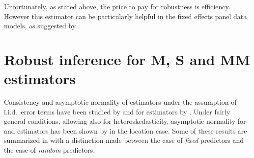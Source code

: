 Unfortunately, as stated above, the price to pay for robustness is efficiency.
However this  estimator can be particularly helpful in the fixed
effects panel data models, as suggested by \citet{bramati:croux:2007}.

\section{Robust inference for M, S and MM estimators}
\label{sec:inference}

Consistency and asymptotic normality of  estimators under the
assumption of i.i.d.\ error terms have been studied by \citet{Yohai:1979} and
for  estimators by \citet{yohai:1987}. Under fairly general
conditions, allowing also for heteroskedasticity, asymptotic normality for
 and  estimators has been shown by
\citet{Salibian-Barrera:2004} in the location case. Some of these results are
summarized in \citet{maronna:etal:2006} with a distinction made between the
case of \emph{fixed} predictors and the case of \emph{random} predictors.

